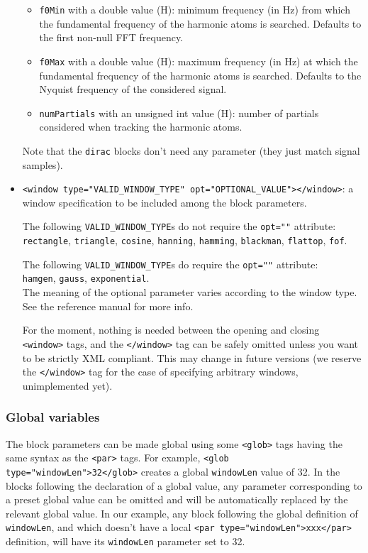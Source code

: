 \documentclass[11pt,a4paper]{article}
\begin{document}
\begin{itemize}
\begin{itemize}
  \item \verb+f0Min+ with a double value (H): minimum frequency (in Hz) from
    which the fundamental frequency of the harmonic atoms is searched. Defaults
    to the first non-null FFT frequency.
    
  \item \verb+f0Max+ with a double value (H): maximum frequency (in Hz) at
    which the fundamental frequency of the harmonic atoms is searched.
    Defaults to the Nyquist frequency of the considered signal.
    
  \item \verb+numPartials+ with an unsigned int value (H): number of partials
    considered when tracking the harmonic atoms.

  \end{itemize}
  Note that the \verb+dirac+ blocks don't need any parameter (they just match
  signal samples).
 
\item \verb+<window type="VALID_WINDOW_TYPE" opt="OPTIONAL_VALUE"></window>+: a
  window specification to be included among the block parameters.
  
  The following \verb+VALID_WINDOW_TYPE+s do not require the \verb+opt=""+
  attribute: \\ \verb+rectangle+, \verb+triangle+, \verb+cosine+, \verb+hanning+,
  \verb+hamming+, \verb+blackman+, \verb+flattop+, \verb+fof+.
  
  The following \verb+VALID_WINDOW_TYPE+s do require the \verb+opt=""+
  attribute: \\ \verb+hamgen+, \verb+gauss+, \verb+exponential+. \\
  The meaning of the optional parameter varies according to the window type.
  See the reference manual for more info.
  
  For the moment, nothing is needed between the opening and closing
  \verb+<window>+ tags, and the \verb+</window>+ tag can be safely omitted
  unless you want to be strictly XML compliant. This may change in future
  versions (we reserve the \verb+</window>+ tag for the case of specifying
  arbitrary windows, unimplemented yet).

\end{itemize}


\subsubsection*{Global variables}

The block parameters can be made global using some \verb+<glob>+ tags having
the same syntax as the \verb+<par>+ tags. For example, \verb+<glob type="windowLen">32</glob>+
creates a global \verb+windowLen+ value of 32. In
the blocks following the declaration of a global value, any parameter
corresponding to a preset global value can be omitted and will be automatically
replaced by the relevant global value. In our example, any block following the
global definition of \verb+windowLen+, and which doesn't have a local
\verb+<par type="windowLen">xxx</par>+ definition, will have its \verb+windowLen+ parameter
set to 32.
\end{document}
